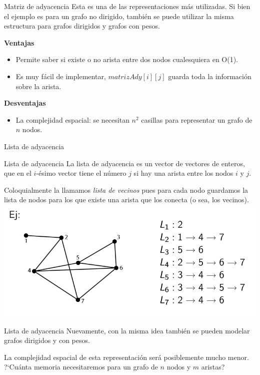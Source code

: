 \documentclass[compress]{beamer}
\newcommand{\bigpause}{\bigskip \pause}
\begin{document}
\begin{frame}{Matriz de adyacencia}
Esta es una de las representaciones m\'as utilizadas. Si bien el ejemplo es para un grafo no dirigido, tambi\'en se puede utilizar la misma estructura para grafos dirigidos y grafos con pesos.
\bigskip

{\bf Ventajas}
\pause
{} {
	\begin{itemize}
		\item Permite saber si existe o no arista entre dos nodos cualesquiera en O(1).
		\item Es muy f\'acil de implementar, $matrizAdy[i][j]$ guarda toda la informaci\'on sobre la arista.
	\end{itemize}
}
\bigpause
{\bf Desventajas}
\pause
{} {
	\begin{itemize}
		\item La complejidad espacial: se necesitan $n^2$ casillas para representar un grafo de $n$ nodos.
	\end{itemize}
}
\end{frame}

\begin{frame}{Lista de adyacencia}
\begin{block}{Lista de adyacencia}
La lista de adyacencia es un vector de vectores de enteros, que en el $i$-ésimo vector tiene el número $j$ si hay una arista entre los nodos $i$ y $j$.
\end{block}

Coloquialmente la llamamos {\it lista de vecinos} pues para cada nodo guardamos la lista de nodos para los que existe una arista que los conecta (o sea, los vecinos).
\bigskip
\includegraphics[scale=0.5]{lista-vecinos.png}
\end{frame}

\begin{frame}{Lista de adyacencia}
Nuevamente, con la misma idea tambi\'en se pueden modelar grafos dirigidos y con pesos.\bigskip

La complejidad espacial de esta representaci\'on ser\'a posiblemente mucho menor. ?`Cu\'anta memoria necesitaremos para un grafo de $n$ nodos y $m$ aristas? 
\end{frame}
\end{document}
